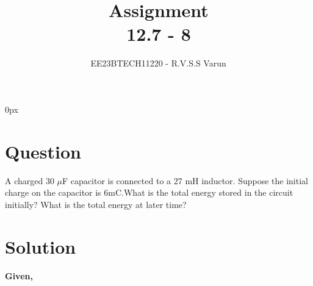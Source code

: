 \documentclass[beamer]{IEEEtran}
\theoremstyle{remark}
\begin{document}
\parindent 0px


\title{Assignment\\[1ex]12.7 - 8}
\author{EE23BTECH11220 - R.V.S.S Varun$^{}$%
}
\maketitle
\newpage
\bigskip

\renewcommand{\thefigure}{\theenumi}
\renewcommand{\thetable}{\theenumi}
\section*{Question}
A charged 30 $\mu$F capacitor is connected to a 27 mH inductor. Suppose the initial charge on the capacitor is 6mC.What is the total energy stored in the circuit initially? What is the
total energy at later time?
\section*{Solution}
\textbf{Given,}
\end{document}
